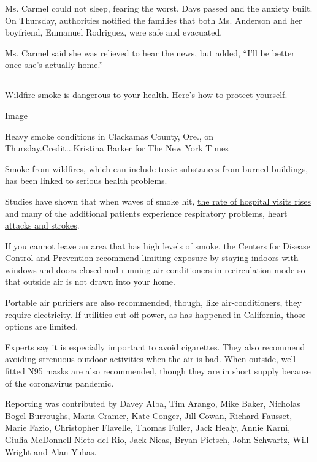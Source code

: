 Ms. Carmel could not sleep, fearing the worst. Days passed and the
anxiety built. On Thursday, authorities notified the families that both
Ms. Anderson and her boyfriend, Enmanuel Rodriguez, were safe and
evacuated.

Ms. Carmel said she was relieved to hear the news, but added, ``I'll be
better once she's actually home.''

\hypertarget{-6}{%
\subsection{}\label{-6}}

Wildfire smoke is dangerous to your health. Here's how to protect
yourself.

Image

Heavy smoke conditions in Clackamas County, Ore., on
Thursday.Credit...Kristina Barker for The New York Times

Smoke from wildfires, which can include toxic substances from burned
buildings, has been linked to serious health problems.

Studies have shown that when waves of smoke hit,
\href{https://insights.ovid.com/epidemiology/epide/2017/01/000/wildfire-specific-fine-particulate-matter-risk/13/00001648}{the
rate of hospital visits rises} and many of the additional patients
experience
\href{https://www.ncbi.nlm.nih.gov/pmc/articles/PMC6015400/}{respiratory
problems, heart attacks and strokes}.

If you cannot leave an area that has high levels of smoke, the Centers
for Disease Control and Prevention recommend
\href{https://www3.epa.gov/airnow/smoke_fires/prepare-for-fire-season-508.pdf}{limiting
exposure} by staying indoors with windows and doors closed and running
air-conditioners in recirculation mode so that outside air is not drawn
into your home.

Portable air purifiers are also recommended, though, like
air-conditioners, they require electricity. If utilities cut off power,
\href{https://www.nytimes3xbfgragh.onion/2020/08/18/us/california-blackouts.html}{as
has happened in California}, those options are limited.

Experts say it is especially important to avoid cigarettes. They also
recommend avoiding strenuous outdoor activities when the air is bad.
When outside, well-fitted N95 masks are also recommended, though they
are in short supply because of the coronavirus pandemic.

Reporting was contributed by Davey Alba, Tim Arango, Mike Baker,
Nicholas Bogel-Burroughs, Maria Cramer, Kate Conger, Jill Cowan, Richard
Fausset, Marie Fazio, Christopher Flavelle, Thomas Fuller, Jack Healy,
Annie Karni, Giulia McDonnell Nieto del Rio, Jack Nicas, Bryan Pietsch,
John Schwartz, Will Wright and Alan Yuhas.

